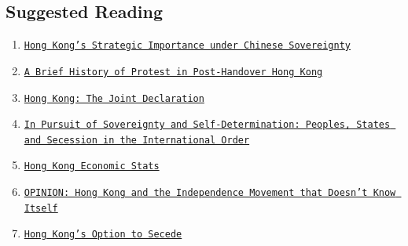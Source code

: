 \documentclass[10pt, letterpaper]{article}
\begin{document}
{\subsection{Suggested Reading}}

\begin{enumerate}
\def\labelenumi{\arabic{enumi}.}
\item
  
  \texttt{\href{https://www.rand.org/content/dam/rand/pubs/conf_proceedings/CF137/CF137.chap10.pdf}{{Hong
  Kong's Strategic Importance under Chinese Sovereignty}}}
  
\item
  
  \texttt{\href{https://time.com/5606212/hong-kong-history-mass-demonstrations-protest/}{{A
  Brief History of Protest in Post-Handover Hong Kong}}}
  
\item
  
  \texttt{\href{https://commonslibrary.parliament.uk/research-briefings/cbp-8616/}{{Hong
  Kong: The Joint Declaration}}}
  
\item
  
  \texttt{\href{https://researchers.mq.edu.au/files/17090721/mq-4466-Publisher\%20version\%20(open\%20access).pdf}{{In
  Pursuit of Sovereignty and Self-Determination: Peoples, States and
  Secession in the International Order}}}
  
\item
  
  \texttt{\href{https://www.heritage.org/index/country/hongkong?version=270}{{Hong
  Kong Economic Stats}}}
  
\item
  
  \texttt{\href{https://www.nytimes.com/2019/09/27/opinion/hong-kong-umbrella.html}{{OPINION:
  Hong Kong and the Independence Movement that Doesn't Know Itself}}}
  
\item
  
  \texttt{\href{https://heinonline.org/HOL/LandingPage?handle=hein.journals/hilj33\&div=21\&id=\&page=}{{Hong
  Kong's Option to Secede}}}
  
\end{enumerate}
\end{document}

